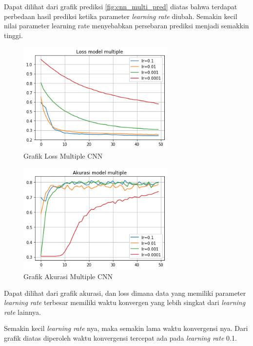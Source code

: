 \documentclass[./skripsi.tex]{subfiles}
\begin{document}
\par Dapat dilihat dari grafik prediksi \ref{fig:cnn_multi_pred} diatas bahwa terdapat perbedaan hasil prediksi ketika parameter \textit{learning rate} diubah. Semakin kecil nilai parameter learning rate menyebabkan persebaran prediksi menjadi semakkin tinggi.
\begin{figure}%
	\centering
	\includegraphics[width=0.7\textwidth]{public/assets/img/cnn_multi_loss.png}
	\caption{Grafik Loss Multiple CNN}
	\label{fig:cnn_multi_loss}
\end{figure}
\begin{figure}%
	\centering
	\includegraphics[width=0.7\textwidth]{public/assets/img/cnn_multi_acc.png}
	\caption{Grafik Akurasi Multiple CNN}
	\label{cnn:cnn_multi_acc}
\end{figure}
\par Dapat dilihat dari grafik akurasi, dan loss dimana data yang memiliki parameter \textit{learning rate} terbesar memiliki waktu konvergen yang lebih singkat dari \textit{learning rate} lainnya.
\par Semakin kecil \textit{learning rate} nya, maka semakin lama waktu konvergensi nya. Dari grafik diatas diperoleh waktu konvergensi tercepat ada pada \textit{learning rate} 0.1.
\end{document}
